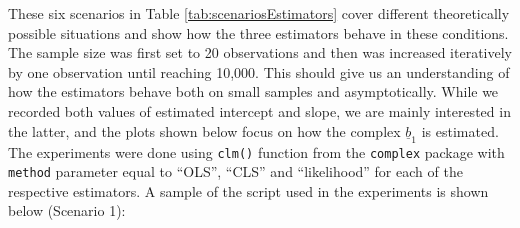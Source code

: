 \documentclass[
]{book}
\begin{document}
These six scenarios in Table \ref{tab:scenariosEstimators} cover different theoretically possible situations and show how the three estimators behave in these conditions. The sample size was first set to 20 observations and then was increased iteratively by one observation until reaching 10,000. This should give us an understanding of how the estimators behave both on small samples and asymptotically. While we recorded both values of estimated intercept and slope, we are mainly interested in the latter, and the plots shown below focus on how the complex \(\underline{b}_1\) is estimated. The experiments were done using \texttt{clm()} function from the \texttt{complex} package with \texttt{method} parameter equal to ``OLS'', ``CLS'' and ``likelihood'' for each of the respective estimators. A sample of the script used in the experiments is shown below (Scenario 1):
\end{document}
